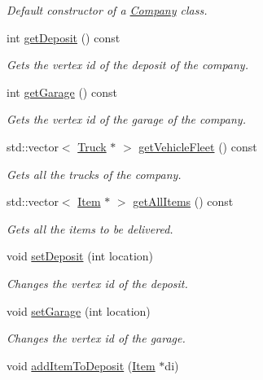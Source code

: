 \begin{DoxyCompactItemize}
\begin{DoxyCompactList}\small\item\em Default constructor of a \hyperlink{class_company}{Company} class. \end{DoxyCompactList}\item 
int \hyperlink{class_company_a16cce0b5b7575af50cb832f02e8d9610}{get\+Deposit} () const 
\begin{DoxyCompactList}\small\item\em Gets the vertex id of the deposit of the company. \end{DoxyCompactList}\item 
int \hyperlink{class_company_ad9a4b50a02c2393d7183538a3625c689}{get\+Garage} () const 
\begin{DoxyCompactList}\small\item\em Gets the vertex id of the garage of the company. \end{DoxyCompactList}\item 
std\+::vector$<$ \hyperlink{class_truck}{Truck} $\ast$ $>$ \hyperlink{class_company_ae041249dd6f97bf132bca19cab1e9bee}{get\+Vehicle\+Fleet} () const 
\begin{DoxyCompactList}\small\item\em Gets all the trucks of the company. \end{DoxyCompactList}\item 
std\+::vector$<$ \hyperlink{class_item}{Item} $\ast$ $>$ \hyperlink{class_company_a34f53f65917de6231eb27f3e1ccfad42}{get\+All\+Items} () const 
\begin{DoxyCompactList}\small\item\em Gets all the items to be delivered. \end{DoxyCompactList}\item 
void \hyperlink{class_company_a7d51c3ae198007427b241b2b5996161b}{set\+Deposit} (int location)
\begin{DoxyCompactList}\small\item\em Changes the vertex id of the deposit. \end{DoxyCompactList}\item 
void \hyperlink{class_company_a489c10753fdc44814a2a384854d05fb7}{set\+Garage} (int location)
\begin{DoxyCompactList}\small\item\em Changes the vertex id of the garage. \end{DoxyCompactList}\item 
void \hyperlink{class_company_affa2ba9f37fcac265568b06dbef8d065}{add\+Item\+To\+Deposit} (\hyperlink{class_item}{Item} $\ast$di)

\end{DoxyCompactItemize}
